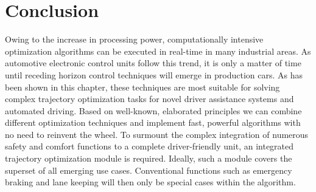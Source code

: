 \section{Conclusion}\label{S:57.6}
Owing to the increase in processing power, computationally intensive optimization algorithms can be executed in real-time in many industrial areas. As automotive electronic control units follow this trend, it is only a matter of time until receding horizon control techniques will emerge in production cars. As has been shown in this chapter, these techniques are most suitable for solving complex trajectory optimization tasks for novel driver assistance systems and automated driving. Based on well-known, elaborated principles we can combine different optimization techniques and implement fast, powerful algorithms with no need to reinvent the wheel.
To surmount the complex integration of numerous safety and comfort functions to a complete driver-friendly unit, an integrated trajectory optimization module is required. Ideally, such a module covers the superset of all emerging use cases. Conventional functions such as emergency braking and lane keeping will then only be special cases within the algorithm.


















